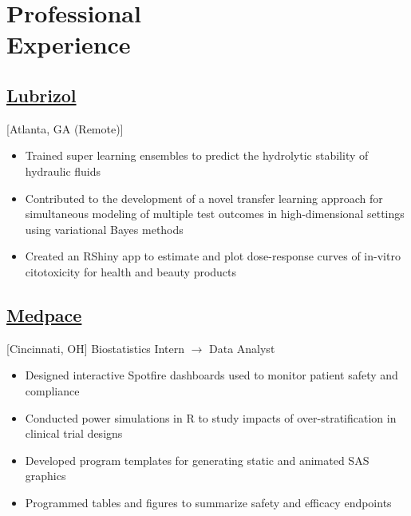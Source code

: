 \section{Professional \\ Experience}

\subsection{\href{https://www.lubrizol.com}{Lubrizol}}[Atlanta, GA (Remote)]
\begin{positions}
\end{positions}

\begin{itemize}
    \item Trained super learning ensembles to predict the hydrolytic stability of hydraulic fluids
    \item Contributed to the development of a novel transfer learning approach for simultaneous modeling of multiple test outcomes in high-dimensional settings using variational Bayes methods
    \item Created an RShiny app to estimate and plot dose-response curves of in-vitro citotoxicity for health and beauty products
\end{itemize}

\subsection{\href{https://www.medpace.com}{Medpace}}[Cincinnati, OH]
\vspace{-\parskip}
Biostatistics Intern $\rightarrow$ Data Analyst \hfill {}

\begin{itemize}
  \item Designed interactive Spotfire dashboards used to monitor patient safety and compliance
  \item Conducted power simulations in R to study impacts of over-stratification in clinical trial designs
  \item Developed program templates for generating static and animated SAS graphics
  \item Programmed tables and figures to summarize safety and efficacy endpoints
\end{itemize}

